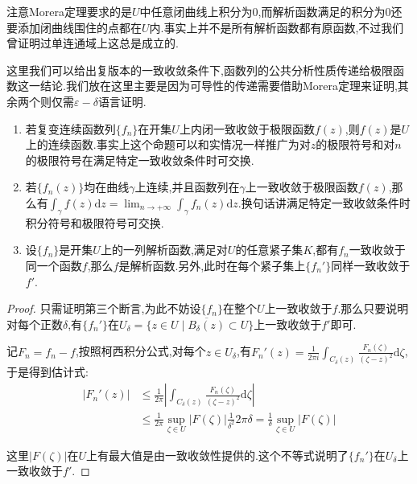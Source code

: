 注意Morera定理要求的是$U$中任意闭曲线上积分为0,而解析函数满足的积分为0还要添加闭曲线围住的点都在$U$内.事实上并不是所有解析函数都有原函数,不过我们曾证明过单连通域上这总是成立的.

这里我们可以给出复版本的一致收敛条件下,函数列的公共分析性质传递给极限函数这一结论.我们放在这里主要是因为可导性的传递需要借助Morera定理来证明,其余两个则仅需$\varepsilon-\delta$语言证明.
\begin{enumerate}
	\item 若复变连续函数列$\{f_n\}$在开集$U$上内闭一致收敛于极限函数$f(z)$,则$f(z)$是$U$上的连续函数.事实上这个命题可以和实情况一样推广为对$z$的极限符号和对$n$的极限符号在满足特定一致收敛条件时可交换.
	\item 若$\{f_n(z)\}$均在曲线$\gamma$上连续,并且函数列在$\gamma$上一致收敛于极限函数$f(z)$,那么有$\int_{\gamma}f(z)\mathrm{d}z=\lim_{n\to+\infty}\int_{\gamma}f_n(z)\mathrm{d}z$.换句话讲满足特定一致收敛条件时积分符号和极限符号可交换.
	\item 设$\{f_n\}$是开集$U$上的一列解析函数,满足对$U$的任意紧子集$K$,都有$f_n$一致收敛于同一个函数$f$,那么$f$是解析函数.另外,此时在每个紧子集上$\{f_n'\}$同样一致收敛于$f'$.
\end{enumerate}
\begin{proof}
	
	只需证明第三个断言,为此不妨设$\{f_n\}$在整个$U$上一致收敛于$f$.那么只要说明对每个正数$\delta$,有$\{f_n'\}$在$U_{\delta}=\{z\in U\mid \overline{B_{\delta}(z)}\subset U\}$上一致收敛于$f'$即可.
	
	记$F_n=f_n-f$,按照柯西积分公式,对每个$z\in U_{\delta}$,有$F_n'(z)=\frac{1}{2\pi i}\int_{C_{\delta}(z)}\frac{F_n(\zeta)}{(\zeta-z)^2}\mathrm{d}\zeta$,于是得到估计式:
	\begin{align*}
	|F_n'(z)|&\le\frac{1}{2\pi}\left|\int_{C_{\delta}(z)}\frac{F_n(\zeta)}{(\zeta-z)^2}\mathrm{d}\zeta\right|\\
	&\le\frac{1}{2\pi}\sup_{\zeta\in U}|F(\zeta)|\frac{1}{\delta^2}2\pi\delta=\frac{1}{\delta}\sup_{\zeta\in U}|F(\zeta)|
	\end{align*}
	
	这里$|F(\zeta)|$在$U$上有最大值是由一致收敛性提供的.这个不等式说明了$\{f_n'\}$在$U_{\delta}$上一致收敛于$f'$.
\end{proof}

